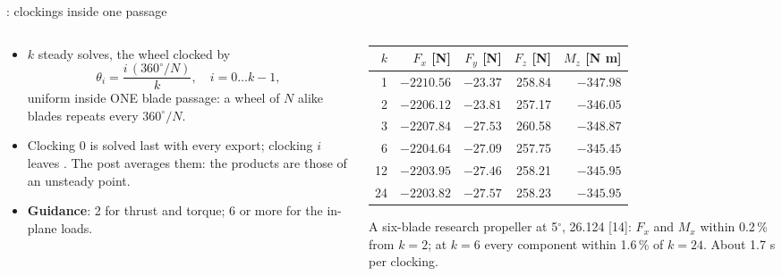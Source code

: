 \begin{frame}{: clockings inside one passage}
\begin{columns}[T]
\begin{column}{0.44\textwidth}
\begin{itemize}\small
  \item \(k\) steady solves, the wheel clocked by
        \[ \theta_i = \frac{i\,(360^\circ/N)}{k}, \quad i = 0 \ldots k-1, \]
        uniform inside ONE blade passage: a wheel of \(N\) alike blades
        repeats every \(360^\circ/N\).
  \item Clocking 0 is solved last with every export; clocking \(i\) leaves
        . The post averages them: the products are
        those of an unsteady point.
  \item \textbf{Guidance}: 2 for thrust and torque; 6 or more for the
        in-plane loads.
\end{itemize}
\end{column}
\begin{column}{0.52\textwidth}
{\ftstablesize\renewcommand{\arraystretch}{1.05}
\begin{tabular*}{\linewidth}{@{\extracolsep{\fill}}rrrrr@{}}
\toprule
\(k\) & \(F_x\) [N] & \(F_y\) [N] & \(F_z\) [N] & \(M_z\) [N m] \\
\midrule
1 & \(-2210.56\) & \(-23.37\) & 258.84 & \(-347.98\) \\
2 & \(-2206.12\) & \(-23.81\) & 257.17 & \(-346.05\) \\
3 & \(-2207.84\) & \(-27.53\) & 260.58 & \(-348.87\) \\
6 & \(-2204.64\) & \(-27.09\) & 257.75 & \(-345.45\) \\
12 & \(-2203.95\) & \(-27.46\) & 258.21 & \(-345.95\) \\
24 & \(-2203.82\) & \(-27.57\) & 258.23 & \(-345.95\) \\
\bottomrule
\end{tabular*}}
\par\vspace{1mm}
{\scriptsize A six-blade research propeller at 5\(^\circ\), 26.124 [14]:
\(F_x\) and \(M_x\) within 0.2\,\% from \(k = 2\); at \(k = 6\) every
component within 1.6\,\% of \(k = 24\). About 1.7 s per clocking.\par}
\end{column}
\end{columns}
\end{frame}

